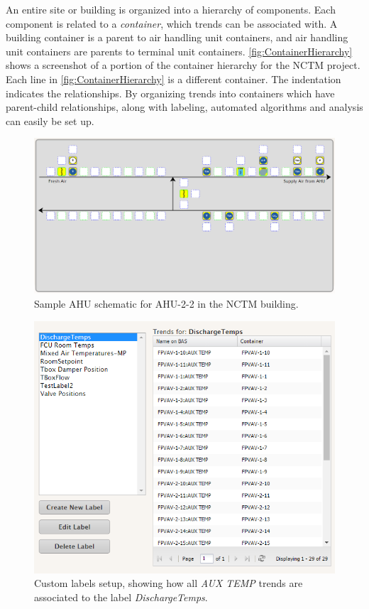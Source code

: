 An entire site or building is organized into a hierarchy of components.
Each component is related to a \textit{container}, which trends can be
associated with.  A building container is a parent to air handling unit
containers, and air handling unit containers are parents to terminal
unit containers.  \figref{} \ref{fig:ContainerHierarchy} shows a
screenshot of a portion of the container hierarchy for the NCTM project.
Each line in \figref{} \ref{fig:ContainerHierarchy} is a different
container. The indentation indicates the relationships. By organizing
trends into containers which have parent-child relationships, along with
labeling, automated algorithms and analysis can easily be set up.

\begin{figure}
\centering
\includegraphics[scale=0.5]{Images/SampleAHUSchematic.PNG}
\caption{Sample AHU schematic for AHU-2-2 in the NCTM building.}
\label{fig:AHUSchematic}
\end{figure}

\begin{figure}
\centering
\includegraphics[scale=0.75]{Images/CustomLabels.PNG}
\caption{Custom labels setup, showing how all \textit{AUX TEMP} trends
are associated to the label \textit{DischargeTemps}. }
\label{fig:CustomLabels}
\end{figure}

